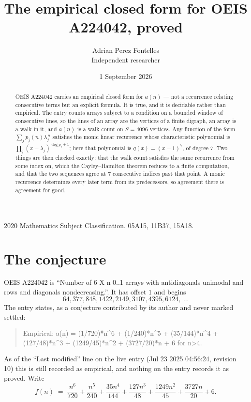 \documentclass[11pt,a4paper]{article}
\title{The empirical closed form for OEIS A224042, proved}
\author{Adrian Perez Fontelles\\ \small Independent researcher}
\date{1 September 2026}
\theoremstyle{plain}
\theoremstyle{definition}
\begin{document}
\maketitle

\begin{abstract}
OEIS A224042 carries an empirical closed form for $a(n)$ --- not a recurrence relating
consecutive terms but an explicit formula. It is true, and it is decidable rather than
empirical. The entry counts arrays subject to a condition on a bounded window of consecutive lines, so the lines of an array are the
vertices of a finite digraph, an array is a walk in it, and $a(n)$ is a walk count on
$S=4096$ vertices. Any function of the form $\sum_j p_j(n)\lambda_j^{\,n}$ satisfies the
monic linear recurrence whose characteristic polynomial is
$\prod_j(x-\lambda_j)^{\deg p_j+1}$; here that polynomial is $q(x)=(x-1)^{7}$, of degree
$7$. Two things are then checked exactly: that the walk count satisfies the same
recurrence from some index on, which the Cayley--Hamilton theorem reduces to a finite
computation, and that the two sequences agree at $7$ consecutive indices past that
point. A monic recurrence determines every later term from its predecessors, so agreement
there is agreement for good.
\end{abstract}

\noindent\small 2020 Mathematics Subject Classification. 05A15, 11B37, 15A18.\normalsize

\section{The conjecture}

OEIS A224042 is ``Number of 6 X n 0..1 arrays with antidiagonals unimodal and rows and diagonals nondecreasing.''. It has offset $1$ and begins
\[
64, 377, 848, 1422, 2149, 3107, 4395, 6124,\ \dots
\]
The entry states, as a conjecture contributed by its author and never marked settled:
\begin{quote}
Empirical: a(n) = (1/720)*n\^{}6 + (1/240)*n\^{}5 + (35/144)*n\^{}4 + (127/48)*n\^{}3 + (1249/45)*n\^{}2 + (3727/20)*n + 6 for n>4.
\end{quote}
As of the ``Last modified'' line on the live entry (Jul 23 2025 04:56:24, revision 10) this is still
recorded as empirical, and nothing on the entry records it as proved. Write
\[
f(n)\;=\;\frac{n^{6}}{720} + \frac{n^{5}}{240} + \frac{35 n^{4}}{144} + \frac{127 n^{3}}{48} + \frac{1249 n^{2}}{45} + \frac{3727 n}{20} + 6.
\]
\end{document}
